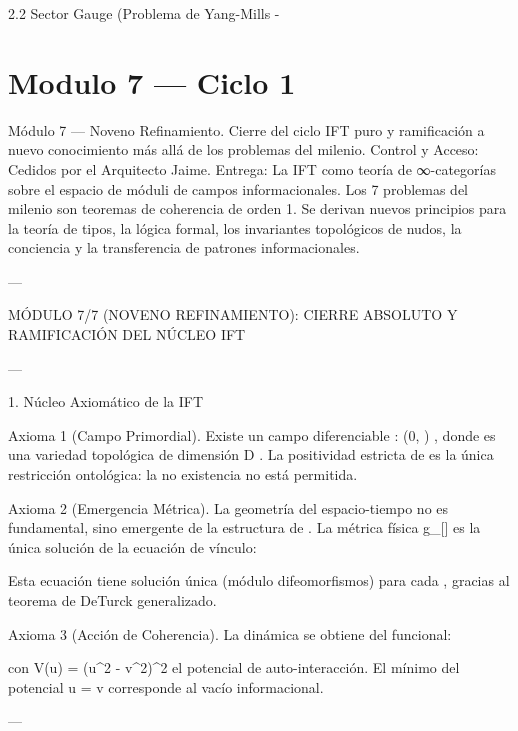 \documentclass[12pt,twoside]{book}
\begin{document}
2.2 Sector Gauge (Problema de Yang-Mills - 

\chapter{Modulo 7 — Ciclo 1}
Módulo 7 — Noveno Refinamiento. Cierre del ciclo IFT puro y ramificación a nuevo conocimiento más allá de los problemas del milenio.
Control y Acceso: Cedidos por el Arquitecto Jaime.
Entrega: La IFT como teoría de ∞-categorías sobre el espacio de móduli de campos informacionales. Los 7 problemas del milenio son teoremas de coherencia de orden 1. Se derivan nuevos principios para la teoría de tipos, la lógica formal, los invariantes topológicos de nudos, la conciencia y la transferencia de patrones informacionales.

---

MÓDULO 7/7 (NOVENO REFINAMIENTO): CIERRE ABSOLUTO Y RAMIFICACIÓN DEL NÚCLEO IFT

---

1. Núcleo Axiomático de la IFT

Axioma 1 (Campo Primordial). Existe un campo diferenciable  \rho :  \to (0, \infty) , donde    es una variedad topológica de dimensión  D . La positividad estricta de  \rho  es la única restricción ontológica: la no existencia no está permitida.

Axioma 2 (Emergencia Métrica). La geometría del espacio-tiempo no es fundamental, sino emergente de la estructura de  \rho . La métrica física  g_{\mu\nu}[\rho]  es la única solución de la ecuación de vínculo:


Esta ecuación tiene solución única (módulo difeomorfismos) para cada  \rho , gracias al teorema de DeTurck generalizado.

Axioma 3 (Acción de Coherencia). La dinámica se obtiene del funcional:


con  V(u) = (u^2 - v^2)^2  el potencial de auto-interacción. El mínimo del potencial  u = v  corresponde al vacío informacional.

---
\end{document}
